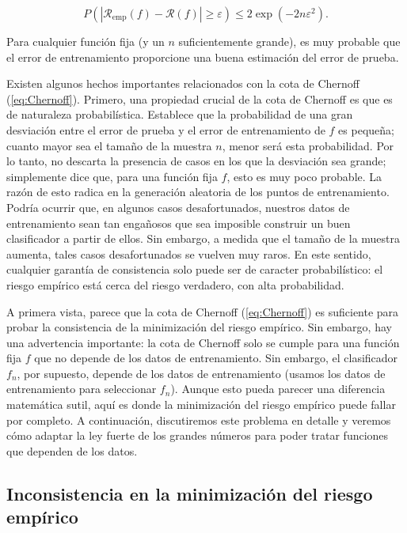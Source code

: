 \documentclass{report}
\begin{document}
\begin{equation}
P(|\mathcal{R}_{\text{emp}}(f) - \mathcal{R}(f)| \geq \varepsilon) \leq 2 \exp(-2n\varepsilon^2).  \label{eq:Chernoff}
\end{equation}

Para cualquier función fija (y un \(n\) suficientemente grande), es muy probable que el error de entrenamiento
proporcione una buena estimación del error de prueba.

Existen algunos hechos importantes relacionados con la cota de Chernoff (\ref{eq:Chernoff}). Primero, una propiedad crucial
de la cota de Chernoff es que es de naturaleza probabilística. Establece que la probabilidad de una gran desviación
entre el error de prueba y el error de entrenamiento de \(f\) es pequeña; cuanto mayor sea el tamaño de la muestra
\(n\), menor será esta probabilidad. Por lo tanto, no descarta la presencia de casos en los que la desviación sea
grande; simplemente dice que, para una función fija \(f\), esto es muy poco probable. La razón de esto radica en la
generación aleatoria de los puntos de entrenamiento. Podría ocurrir que, en algunos casos desafortunados, nuestros
datos de entrenamiento sean tan engañosos que sea imposible construir un buen clasificador a partir de ellos. Sin
embargo, a medida que el tamaño de la muestra aumenta, tales casos desafortunados se vuelven muy raros. En este
sentido, cualquier garantía de consistencia solo puede ser de caracter probabilístico: el riesgo empírico está cerca del riesgo
verdadero, con alta probabilidad.

A primera vista, parece que la cota de Chernoff (\ref{eq:Chernoff}) es suficiente para probar la consistencia de la minimización
del riesgo empírico. Sin embargo, hay una advertencia importante: la cota de Chernoff solo se cumple para una función
fija \(f\) que no depende de los datos de entrenamiento. Sin embargo, el clasificador \(f_n\), por supuesto, depende
de los datos de entrenamiento (usamos los datos de entrenamiento para seleccionar \(f_n\)). Aunque esto pueda parecer
una diferencia matemática sutil, aquí es donde la minimización del riesgo empírico puede fallar por completo. A
continuación, discutiremos este problema en detalle y veremos cómo adaptar la ley fuerte de los grandes números para
poder tratar funciones que dependen de los datos.

\subsection{Inconsistencia en la minimización del riesgo empírico} \label{Inconsistencia en la minimización del riesgo empírico}
\end{document}
